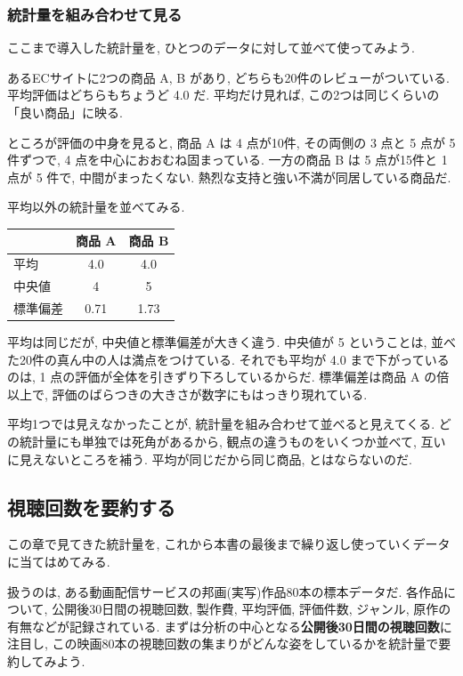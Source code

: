     \subsubsection*{統計量を組み合わせて見る}

    ここまで導入した統計量を, ひとつのデータに対して並べて使ってみよう.

    あるECサイトに2つの商品 A, B があり, どちらも20件のレビューがついている.
    平均評価はどちらもちょうど 4.0 だ.
    平均だけ見れば, この2つは同じくらいの「良い商品」に映る.

    ところが評価の中身を見ると, 商品 A は 4 点が10件, その両側の 3 点と 5 点が 5 件ずつで, 4 点を中心におおむね固まっている. 一方の商品 B は 5 点が15件と 1 点が 5 件で, 中間がまったくない.
    熱烈な支持と強い不満が同居している商品だ.

    平均以外の統計量を並べてみる.

    \begin{center}
      \begin{tabular}{l|cc}
        & 商品 A & 商品 B \\ \hline
        平均 & 4.0 & 4.0 \\
        中央値 & 4 & 5 \\
        標準偏差 & 0.71 & 1.73 \\
      \end{tabular}
    \end{center}

    平均は同じだが, 中央値と標準偏差が大きく違う.
    中央値が 5 ということは, 並べた20件の真ん中の人は満点をつけている.
    それでも平均が 4.0 まで下がっているのは, 1 点の評価が全体を引きずり下ろしているからだ.
    標準偏差は商品 A の倍以上で, 評価のばらつきの大きさが数字にもはっきり現れている.

    平均1つでは見えなかったことが, 統計量を組み合わせて並べると見えてくる.
    どの統計量にも単独では死角があるから, 観点の違うものをいくつか並べて, 互いに見えないところを補う.
    平均が同じだから同じ商品, とはならないのだ.

  \subsection{視聴回数を要約する}

    この章で見てきた統計量を, これから本書の最後まで繰り返し使っていくデータに当てはめてみる.

    扱うのは, ある動画配信サービスの邦画(実写)作品80本の標本データだ.
    各作品について, 公開後30日間の視聴回数, 製作費, 平均評価, 評価件数, ジャンル, 原作の有無などが記録されている.
    まずは分析の中心となる\textbf{公開後30日間の視聴回数}に注目し, この映画80本の視聴回数の集まりがどんな姿をしているかを統計量で要約してみよう.

